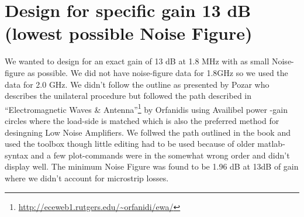 \documentclass{article}
\begin{document}
\section{Design for specific gain 13 dB (lowest possible Noise Figure)}
We wanted to design for an exact gain of 13 dB at 1.8 MHz with as small Noise-figure as possible.
We did not have noise-figure data for 1.8GHz so we used the data for 2.0 GHz.
We didn't follow the outline as presented by Pozar who describes the unilateral procedure
but followed the path described in ``Electromagnetic Waves \& Antenna''\footnote{\url{http://eceweb1.rutgers.edu/~orfanidi/ewa/}}
by Orfanidis using Availibel power -gain circles where the load-side is matched which is also the preferred method
for desingning Low Noise Amplifiers. We follwed the path outlined in the book and used the toolbox though little
editing had to be used because of older matlab-syntax and a few plot-commands were in the somewhat wrong order
and didn't display well. The minimum Noise Figure was found to be 1.96 dB at 13dB of gain
where we didn't account for microstrip losses.
\end{document}
